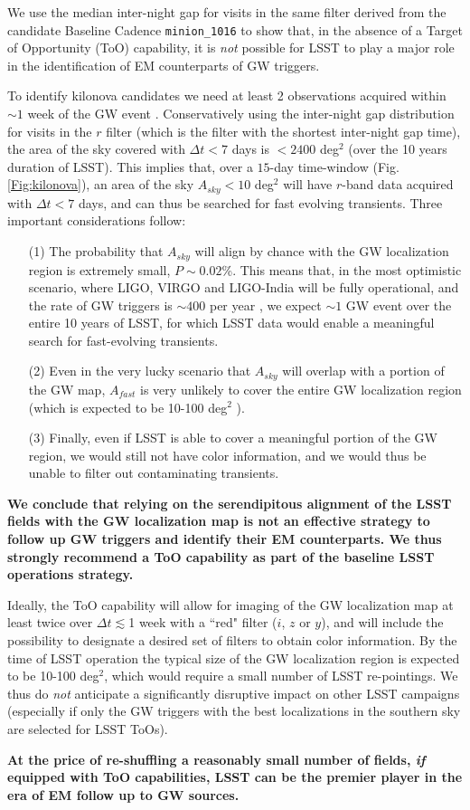 We use the median inter-night gap  for visits in the same filter derived from the candidate Baseline Cadence \texttt{minion\_1016} to show that, in the absence of a Target of Opportunity (ToO) capability, it is \emph{not} possible for LSST  to play a major role in the identification of EM counterparts of GW triggers.  

To identify kilonova candidates we need at least 2 observations acquired within $\sim 1$ week  of the GW event \citep{Cowperthwaite15}.
Conservatively using the inter-night gap distribution for visits in the $r$ filter (which is the filter with the shortest  inter-night gap time), the area of the sky covered with  $\Delta t<7$ days is $<2400$ deg$^2$ (over the 10 years duration of LSST). This implies that, over a $15$-day time-window (Fig. \ref{Fig:kilonova}), an area of the sky $A_{sky}<10$ deg$^2$ will have $r$-band data acquired with $\Delta t<7$ days, and can thus be searched for fast evolving transients.  Three important considerations follow:
\begin{itemize}
\item[(1)] The probability that $A_{sky}$ will align by chance with the GW localization region is extremely small,  $P\sim0.02$\%. This means that,  in the most optimistic scenario, where LIGO, VIRGO and LIGO-India will be fully operational, and the rate of GW triggers is $\sim400$ per year \citep{Abbott2016LRR}, we expect $\sim1$ GW event over the entire 10 years of LSST, for which LSST data would enable a meaningful search for fast-evolving transients.
\item[(2)] Even in the very lucky scenario that $A_{sky}$ will overlap with a portion of  the GW map, $A_{fast}$ is very unlikely to cover the entire GW localization region (which is expected to be 10-100 deg$^2$ \citep{Abbott2016LRR}).
\item[(3)]  Finally, even if LSST is able to cover a meaningful portion of the GW region, we would still not have color information, and we would thus be unable to filter out contaminating transients.
\end{itemize}

\textbf{We conclude that relying on the serendipitous alignment of the LSST fields with the GW localization map is not an effective strategy to follow up GW triggers and identify their EM counterparts. We thus strongly recommend a ToO capability as part of the baseline LSST operations strategy.}

Ideally, the ToO capability will allow for imaging of the GW localization map at least twice over $\Delta t\lesssim$1 week with a ``red" filter ($i$, $z$  or $y$),  and  will include the possibility to designate a desired set of filters to obtain color information. By the time of LSST operation the typical size of the GW localization region is expected to be 10-100 deg$^2$, which would require a small number of LSST re-pointings. We thus do \emph{not} anticipate a significantly disruptive impact on other LSST campaigns (especially if only the GW triggers with the best localizations in the southern sky are selected for LSST ToOs).

\textbf{At the price of re-shuffling a reasonably small number of fields, \emph{if} equipped with ToO capabilities, LSST can be the premier player in the era of EM follow up to GW sources.}







\navigationbar
